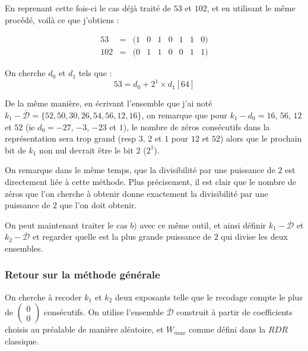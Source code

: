 \documentclass[12pt, a4paper]{memoir}
\newcommand{\doublezero}{\begin{pmatrix} 0 \\ 0 \end{pmatrix}}
\newcommand{\dbarre}{\overline{\mathcal{D}}}
\begin{document}
 En reprenant cette fois-ci le cas déjà traité de $53$ et $102$, et en utilisant le même procédé, voilà ce 
 que j'obtiens :
 
   $$\begin{array}{ccccccccc}
  53 & = & (1 & 0 & 1 & 0 & 1 & 1 & 0) \\
  102 & = & (0 & 1 & 1 & 0 & 0 & 1 & 1)
 \end{array}$$
 
 On cherche $d_0$ et $d_1$ tels que :
  \begin{equation}
 53 = d_0 + 2^1 \times d_1 [64]
\end{equation}
 
 De la même manière, en écrivant l'ensemble que j'ai noté $k_1 - \dbarre = \{52,50,30,26,54,56,12,16\}$, 
 on remarque que pour $k_1 - d_0 = 16$, $56$, $12$ et $52$ (ie $d_0 = -27$, $-3$, $-23$ et $1$), le nombre de 
 zéros consécutifs dans la représentation sera trop grand (resp $3$, $2$ et $1$ pour $12$ et $52$) alors que
 le prochain bit de $k_1$ non nul devrait être le bit $2$ ($2^1$).
 
 On remarque dans le même temps, que la divisibilité par une puissance de $2$ est directement liée à cette méthode.
 Plus précisement, il est clair que le nombre de zéros que l'on cherche à obtenir donne exactement 
 la divisibilité par une puissance de $2$ que l'on doit obtenir. 
 
 On peut maintenant traiter le cas $b)$ avec ce même outil, et ainsi définir $k_1 - \dbarre$ et $k_2 - \dbarre$
 et regarder quelle est la plus grande puissance de $2$ qui divise les deux ensembles.
 
  \subsubsection{Retour sur la méthode générale}
  
  On cherche à recoder $k_1$ et $k_2$ deux exposants telle que le recodage compte le plus de $\doublezero$ consécutifs.
  On utilise l'ensemble $\dbarre$ construit à partir de coefficients choisis au préalable de manière aléatoire,
  et $W_{max}$ comme défini dans la $RDR$ classique.
  
\end{document}

